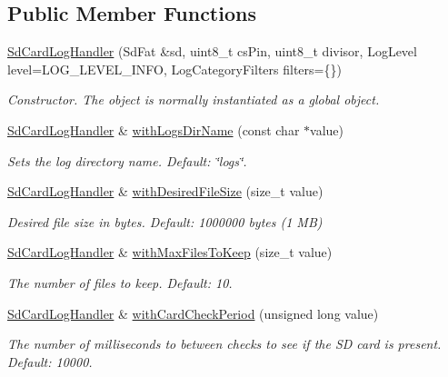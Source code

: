 \subsection*{Public Member Functions}
\begin{DoxyCompactItemize}
\item 
\mbox{\hyperlink{class_sd_card_log_handler_a307fc19ae158016fa223b245210a050c}{Sd\+Card\+Log\+Handler}} (Sd\+Fat \&sd, uint8\+\_\+t cs\+Pin, uint8\+\_\+t divisor, Log\+Level level=L\+O\+G\+\_\+\+L\+E\+V\+E\+L\+\_\+\+I\+N\+FO, Log\+Category\+Filters filters=\{\})
\begin{DoxyCompactList}\small\item\em Constructor. The object is normally instantiated as a global object. \end{DoxyCompactList}\item 
\mbox{\hyperlink{class_sd_card_log_handler}{Sd\+Card\+Log\+Handler}} \& \mbox{\hyperlink{class_sd_card_log_handler_a6f6d18ab8065c69c1334191defa702f2}{with\+Logs\+Dir\+Name}} (const char $\ast$value)
\begin{DoxyCompactList}\small\item\em Sets the log directory name. Default\+: \char`\"{}logs\char`\"{}. \end{DoxyCompactList}\item 
\mbox{\hyperlink{class_sd_card_log_handler}{Sd\+Card\+Log\+Handler}} \& \mbox{\hyperlink{class_sd_card_log_handler_acc76163e6861837a80f46c0d7aa77176}{with\+Desired\+File\+Size}} (size\+\_\+t value)
\begin{DoxyCompactList}\small\item\em Desired file size in bytes. Default\+: 1000000 bytes (1 MB) \end{DoxyCompactList}\item 
\mbox{\hyperlink{class_sd_card_log_handler}{Sd\+Card\+Log\+Handler}} \& \mbox{\hyperlink{class_sd_card_log_handler_a0a126f5fd8c00b51e49319583f32b0c1}{with\+Max\+Files\+To\+Keep}} (size\+\_\+t value)
\begin{DoxyCompactList}\small\item\em The number of files to keep. Default\+: 10. \end{DoxyCompactList}\item 
\mbox{\hyperlink{class_sd_card_log_handler}{Sd\+Card\+Log\+Handler}} \& \mbox{\hyperlink{class_sd_card_log_handler_aa521412fc6bb7cba7c0413ab14f37c6f}{with\+Card\+Check\+Period}} (unsigned long value)
\begin{DoxyCompactList}\small\item\em The number of milliseconds to between checks to see if the SD card is present. Default\+: 10000. \end{DoxyCompactList}\item 

\end{DoxyCompactItemize}
